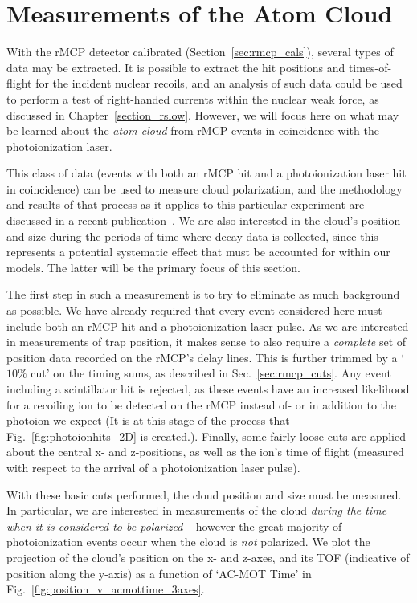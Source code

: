 \section{Measurements of the Atom Cloud}
\label{sec:cloud_calibration}
With the rMCP detector calibrated (Section~\ref{sec:rmcp_cals}), several types of data may be extracted.  It is possible to extract the hit positions and times-of-flight for the incident nuclear recoils, and an analysis of such data could be used to perform a test of right-handed currents within the nuclear weak force, as discussed in Chapter~\ref{section_rslow}.  However, we will focus here on what may be learned about the \emph{atom cloud} from rMCP events in coincidence with the photoionization laser.~  

This class of data (events with both an rMCP hit and a photoionization laser hit in coincidence) can be used to measure cloud polarization, and the methodology and results of that process as it applies to this particular experiment are discussed in a recent publication~\cite{ben_OP}.  We are also interested in the cloud's position and size during the periods of time where decay data is collected, since this represents a potential systematic effect that must be accounted for within our models.  The latter will be the primary focus of this section.  

The first step in such a measurement is to try to eliminate as much background as possible.  We have already required that every event considered here must include both an rMCP hit and a photoionization laser pulse.  As we are interested in measurements of trap position, it makes sense to also require a \emph{complete} set of position data recorded on the rMCP's delay lines.   This is further trimmed by a `$10\%$ cut' on the timing sums, as described in Sec.~\ref{sec:rmcp_cuts}.  Any event including a scintillator hit is rejected, as these events have an increased likelihood for a recoiling ion to be detected on the rMCP instead of- or in addition to the photoion we expect (It is at this stage of the process that Fig.~\ref{fig:photoionhits_2D} is created.).  Finally, some fairly loose cuts are applied about the central x- and z-positions, as well as the ion's time of flight (measured with respect to the arrival of a photoionization laser pulse).

With these basic cuts performed, the cloud position and size must be measured.  In particular, we are interested in measurements of the cloud \emph{during the time when it is considered to be polarized} -- however the great majority of photoionization events occur when the cloud is \emph{not} polarized.  We plot the projection of the cloud's position on the x- and z-axes, and its TOF (indicative of position along the y-axis) as a function of `AC-MOT Time' in Fig.~\ref{fig:position_v_acmottime_3axes}.

